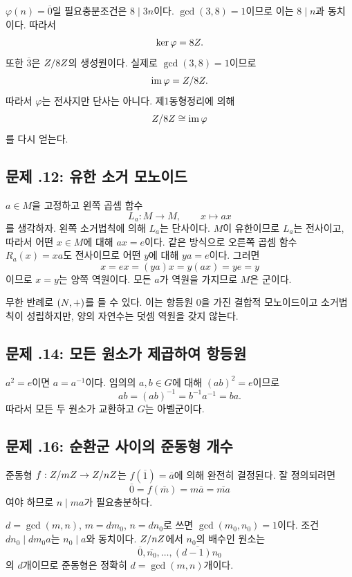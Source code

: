 \begin{solution}
$\varphi(n)=\overline0$일 필요충분조건은 $8\mid3n$이다. $\gcd(3,8)=1$이므로 이는 $8\mid n$과 동치이다. 따라서
\[
  \ker\varphi=8Z.
\]
또한 $\overline3$은 $Z/8Z$의 생성원이다. 실제로 $\gcd(3,8)=1$이므로
\[
  \operatorname{im}\varphi=Z/8Z.
\]
따라서 $\varphi$는 전사지만 단사는 아니다. 제1동형정리에 의해
\[
  Z/8Z\cong\operatorname{im}\varphi
\]
를 다시 얻는다.
\end{solution}

\subsection*{문제 \thechapter.12: 유한 소거 모노이드}

\begin{solution}
$a\in M$을 고정하고 왼쪽 곱셈 함수
\[
  L_a:M\to M,\qquad x\mapsto ax
\]
를 생각하자. 왼쪽 소거법칙에 의해 $L_a$는 단사이다. $M$이 유한이므로 $L_a$는 전사이고, 따라서 어떤 $x\in M$에 대해 $ax=e$이다. 같은 방식으로 오른쪽 곱셈 함수 $R_a(x)=xa$도 전사이므로 어떤 $y$에 대해 $ya=e$이다. 그러면
\[
  x=ex=(ya)x=y(ax)=ye=y
\]
이므로 $x=y$는 양쪽 역원이다. 모든 $a$가 역원을 가지므로 $M$은 군이다.

무한 반례로 $(N,+)$를 들 수 있다. 이는 항등원 $0$을 가진 결합적 모노이드이고 소거법칙이 성립하지만, 양의 자연수는 덧셈 역원을 갖지 않는다.
\end{solution}

\subsection*{문제 \thechapter.14: 모든 원소가 제곱하여 항등원}

\begin{solution}
$a^2=e$이면 $a=a^{-1}$이다. 임의의 $a,b\in G$에 대해 $(ab)^2=e$이므로
\[
  ab=(ab)^{-1}=b^{-1}a^{-1}=ba.
\]
따라서 모든 두 원소가 교환하고 $G$는 아벨군이다.
\end{solution}

\subsection*{문제 \thechapter.16: 순환군 사이의 준동형 개수}

\begin{solution}
준동형 $f:Z/mZ\to Z/nZ$는 $f(\overline1)=\overline a$에 의해 완전히 결정된다. 잘 정의되려면
\[
  \overline0=f(\overline m)=m\overline a=\overline{ma}
\]
여야 하므로 $n\mid ma$가 필요충분하다.

$d=\gcd(m,n)$, $m=dm_0$, $n=dn_0$로 쓰면 $\gcd(m_0,n_0)=1$이다. 조건 $dn_0\mid dm_0a$는 $n_0\mid a$와 동치이다. $Z/nZ$에서 $n_0$의 배수인 원소는
\[
  \overline0,\overline{n_0},\dots,\overline{(d-1)n_0}
\]
의 $d$개이므로 준동형은 정확히 $d=\gcd(m,n)$개이다.
\end{solution}

